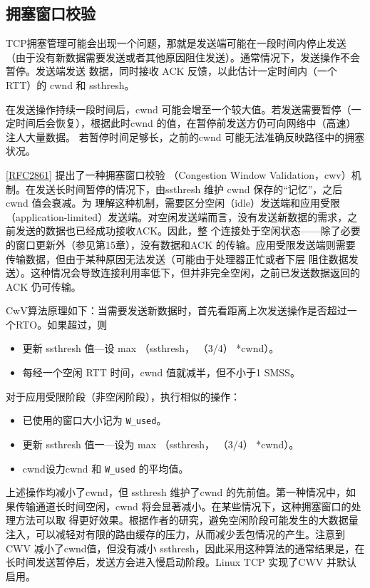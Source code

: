 \subsection{拥塞窗口校验}
TCP拥塞管理可能会出现一个问题，那就是发送端可能在一段时间内停止发送（由于没有新数据需要发送或者其他原因阻住发送）。通常情况下，发送操作不会暂停。发送端发送
数据，同时接收 ACK 反馈，以此估计一定时间内（一个 RTT）的 cwnd 和 ssthresh。

在发送操作持续一段时间后，cwnd 可能会增至一个较大值。若发送需要暂停（一定时间后会恢复），根据此时cwnd 的值，在暂停前发送方仍可向网络中（高速）注人大量数据。
若暂停时间足够长，之前的cwnd 可能无法准确反映路径中的拥塞状况。

\href{https://www.rfc-editor.org/rfc/rfc2861}{[RFC2861]} 提出了一种拥塞窗口校验 （Congestion Window Validation，cwv）机制。在发送长时间暂停的情况下，由ssthresh 维护 cwnd 保存的“记忆”，之后cwnd 值会衰减。为
理解这种机制，需要区分空闲（idle）发送端和应用受限（application-limited）发送端。对空闲发送端而言，没有发送新数据的需求，之前发送的数据也已经成功接收ACK。因此，整
个连接处于空闲状态——除了必要的窗口更新外（参见第15章），没有数据和ACK 的传输。应用受限发送端则需要传输数据，但由于某种原因无法发送（可能由于处理器正忙或者下层
阻住数据发送）。这种情况会导致连接利用率低下，但并非完全空闲，之前已发送数据返回的ACK 仍可传输。

CwV算法原理如下：当需要发送新数据时，首先看距离上次发送操作是否超过一个RTO。如果超过，则

\begin{itemize}
    \item 更新 ssthresh 值—设 max （ssthresh， （3/4） *cwnd）。
    \item 每经一个空闲 RTT 时间，cwnd 值就减半，但不小于1 SMSS。
\end{itemize}
对于应用受限阶段（非空闲阶段），执行相似的操作：
\begin{itemize}
    \item 已使用的窗口大小记为 \verb|W_used|。
    \item 更新 ssthresh 值一—设为 max （ssthresh， （3/4） *cwnd）。
    \item cwnd设力cwnd 和 \verb|W_used| 的平均值。
\end{itemize}

上述操作均减小了cwnd，但 ssthresh 维护了cwnd 的先前值。第一种情况中，如果传输通道长时间空闲，cwnd 将会显著减小。在某些情况下，这种拥塞窗口的处理方法可以取
得更好效果。根据作者的研究，避免空闲阶段可能发生的大数据量注入，可以减轻对有限的路由缓存的压力，从而减少丢包情况的产生。注意到CWV 减小了cwnd值，但没有减小
ssthresh，因此采用这种算法的通常结果是，在长时间发送暂停后，发送方会进入慢启动阶段。Linux TCP 实现了CWV 并默认启用。

